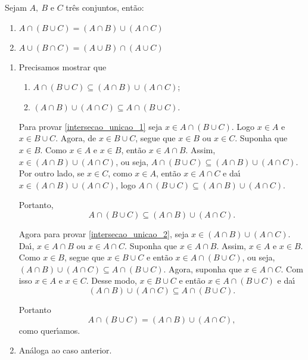 \begin{proposicao} Sejam $A,\ B$ e $C$ tr{\^e}s conjuntos, ent{\~a}o:
	\begin{enumerate}[label={\roman*})]
		\item $A\cap(B\cup C)=(A\cap B)\cup(A\cap C)$
		\item $A\cup(B\cap C)=(A\cup B)\cap(A\cup C)$
	\end{enumerate}
\end{proposicao}
\begin{prova}
	\begin{enumerate}[label={\roman*})]
		\item Precisamos mostrar que
		\begin{enumerate}[label={\roman*})]
			\item $A\cap(B\cup C)\subseteq(A\cap B)\cup(A\cap C)$;\label{intersecao_unicao_1}
			\item $(A\cap B)\cup(A\cap C)\subseteq A\cap(B\cup C).$\label{intersecao_unicao_2}
		\end{enumerate}

		Para provar \ref{intersecao_unicao_1} seja $x\in A \cap (B \cup C)$. Logo $x\in A$ e $x\in B\cup C$. Agora, de $x\in B\cup C$, segue que $x\in B$ ou $x\in C$. Suponha que $x\in B$. Como $x\in A$ e $x \in B$, ent\~ao $x\in A\cap B$. Assim, $x\in(A\cap B)\cup(A\cap C)$, ou seja, $A\cap(B\cup C)\subseteq(A\cap B)\cup(A\cap C)$. Por outro lado, se $x\in C$, como $x\in A$, ent{\~a}o $x\in A\cap C$ e da{\'\i} $x\in(A\cap B)\cup(A\cap C)$, logo $A\cap(B\cup C)\subseteq(A\cap B)\cup(A\cap C)$.

		Portanto,
		\[
			A\cap(B\cup C)\subseteq(A\cap B)\cup(A\cap C).
		\]

		Agora para provar \ref{intersecao_unicao_2}, seja $x\in(A\cap B)\cup(A\cap C)$. Da{\'\i}, $x\in A\cap B$ ou $x\in A\cap C$. Suponha que $x\in A\cap B$. Assim, $x\in A$ e $x\in B$. Como $x\in B$, segue que $x\in B\cup C$ e ent{\~a}o $x\in A\cap(B\cup C)$, ou seja, $(A\cap B)\cup(A\cap C)\subseteq A\cap(B\cup C)$. Agora, suponha que $x\in A\cap C$. Com isso $x\in A$ e $x\in C$. Desse modo, $x\in B\cup C$ e ent{\~a}o $x\in A\cap(B\cup C)$ e da{\'\i}
		\[
			(A\cap B)\cup(A\cap C)\subseteq A\cap(B\cup C).
		\]

		Portanto
		\[
			A\cap(B\cup C)=(A\cap B)\cup(A\cap C),
		\]
		como quer{\'\i}amos.
		\item An\'aloga ao caso anterior.
	\end{enumerate}
\end{prova}

